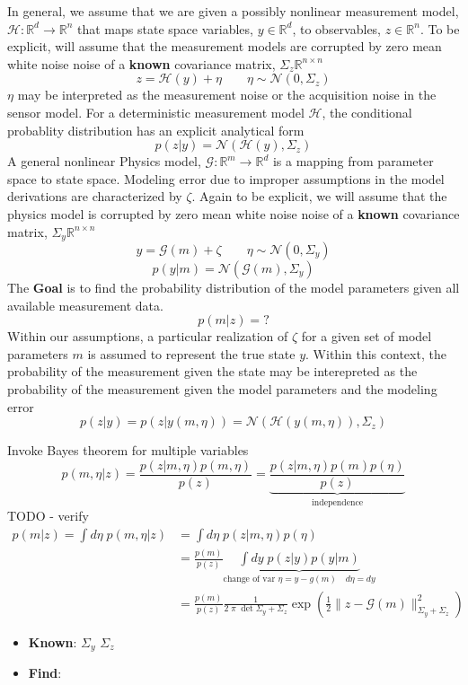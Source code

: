 \documentclass[10pt]{amsart}
\begin{document}
In general, we assume that we are given a possibly nonlinear
measurement model, $\mathcal{H}: \mathbb{R}^d \rightarrow \mathbb{R}^n $ 
that maps state space variables, $y \in \mathbb{R}^d$, to observables, $z \in \mathbb{R}^n$.
To be explicit, will assume that the
measurement models are corrupted by zero mean white noise noise of a
\textbf{known} covariance matrix, $\Sigma_z \mathbb{R}^{n \times n}$ 
\[
    z = \mathcal{H}(y) + \eta   \qquad   \eta \sim \mathcal{N}(0,\Sigma_z) 
\]
$\eta$ may be interpreted as the measurement noise or the acquisition noise
in the sensor model. For a deterministic measurement model $\mathcal{H}$,
the conditional probablity distribution has an explicit analytical form
\[
  p(z|y) =  \mathcal{N}(\mathcal{H}(y),\Sigma_z) 
\]
A general nonlinear
Physics model, $\mathcal{G}: \mathbb{R}^m \rightarrow \mathbb{R}^d $ 
is a mapping from parameter space to state space. Modeling error due to
improper assumptions in the model derivations are characterized by $\zeta$.
Again to be explicit, we will assume that the physics model is 
corrupted by zero mean white noise noise of a
\textbf{known} covariance matrix, $\Sigma_y \mathbb{R}^{n \times n}$ 
\[
    y = \mathcal{G}(m) + \zeta    \qquad   \eta \sim \mathcal{N}(0,\Sigma_y) 
\]
\[
  p(y|m) =  \mathcal{N}(\mathcal{G}(m),\Sigma_y) 
\]
The \textbf{Goal} is to find the probability distribution of the model
parameters given all available measurement data.
\[
  p(m|z) =  ?
\]
Within our assumptions, a particular realization of $\zeta$
for a given set of model parameters $m$ is assumed to represent the true state $y$.
Within this context, the probability of the measurement given the state may
be interepreted as the probability of the measurement given the model
parameters and the modeling error
\[
  p(z|y) = p( z|y(m,\eta) ) =  \mathcal{N}(\mathcal{H}(y(m,\eta) ),\Sigma_z) 
\]

Invoke Bayes theorem for multiple variables
\[
    p(m,\eta|z) = \frac{ p(z|m,\eta) p(m,\eta)}{ p(z) } 
                = \underbrace{\frac{ p(z|m,\eta) p(m) p(\eta)}{ p(z) }}_\text{independence}
\]
{\color{red} TODO - verify}
\[
\begin{split}
    p(m|z) = \int d\eta \; p(m,\eta|z)  & = \int d\eta \; p(z|m,\eta) p(\eta) \\
    & = \frac{ p(m)}{ p(z) } \underbrace{\int dy \; p(z|y) p(y|m) }_{
                      \text{change of var }  \eta = y - g(m) \quad d \eta = dy }  \\
    & = \frac{ p(m)}{ p(z) }  \frac{1}{2 \; \pi \; \det{\Sigma_y+\Sigma_z}} \exp\left( \frac{1}{2} \| z - \mathcal{G}(m)\|^2_{\Sigma_y+\Sigma_z}\right)
\end{split}
\]
 \begin{itemize}
   \item \textbf{Known}: $\Sigma_y$  $\Sigma_z$ 
   \item \textbf{Find}: 
 \end{itemize}
\end{document}
